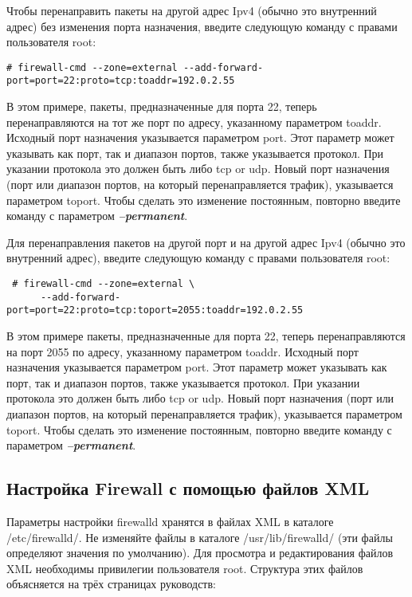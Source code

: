 \documentclass[a4paper,10pt,twoside]{article}
\begin{document}
Чтобы перенаправить пакеты на другой адрес Ipv4 (обычно это внутренний адрес) без изменения порта назначения, введите следующую команду с правами пользователя root:  
\begin{verbatim}
# firewall-cmd --zone=external --add-forward-port=port=22:proto=tcp:toaddr=192.0.2.55
\end{verbatim} 

В этом примере, пакеты, предназначенные для порта 22, теперь перенаправляются на тот же порт по адресу, указанному параметром toaddr. Исходный порт назначения указывается параметром port. Этот параметр может указывать как порт, так и диапазон портов, также указывается протокол. При указании протокола это должен быть либо tcp or udp. Новый порт назначения (порт или диапазон портов, на который перенаправляется трафик), указывается параметром toport. Чтобы сделать это изменение постоянным, повторно введите команду с параметром \textit{\textbf{--permanent}}.

Для перенаправления пакетов на другой порт и на другой адрес Ipv4 (обычно это внутренний адрес), введите следующую команду с правами пользователя root:
\begin{verbatim}
 # firewall-cmd --zone=external \
      --add-forward-port=port=22:proto=tcp:toport=2055:toaddr=192.0.2.55
\end{verbatim}


В этом примере пакеты, предназначенные для порта 22, теперь перенаправляются на порт 2055 по адресу, указанному параметром toaddr. Исходный порт назначения указывается параметром port. Этот параметр может указывать как порт, так и диапазон портов, также указывается протокол. При указании протокола это должен быть либо tcp or udp. Новый порт назначения (порт или диапазон портов, на который перенаправляется трафик), указывается параметром toport. Чтобы сделать это изменение постоянным, повторно введите команду с параметром \textit{\textbf{--permanent}}.
⁠


\subsection{Настройка Firewall с помощью файлов XML}
Параметры настройки firewalld хранятся в файлах XML в каталоге /etc/firewalld/. Не изменяйте файлы в каталоге /usr/lib/firewalld/ (эти файлы определяют значения по умолчанию). Для просмотра и редактирования файлов XML необходимы привилегии пользователя root. Структура этих файлов объясняется на трёх страницах руководств:
\end{document}
